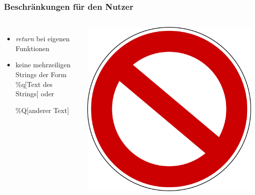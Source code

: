 \begin{frame}
\frametitle{Beschränkungen für den Nutzer}
  \begin{columns}
    \begin{itemize}
    \item \textit{return} bei eigenen Funktionen
    \item keine mehrzeiligen Strings der Form             
    \%q[Text des Strings] oder 
    
    \%Q[anderer Text]
    \end{itemize}
  \includegraphics[scale=0.15]{preprocessor/pics/Verbotsschild}
  \end{columns} 
\end{frame}
